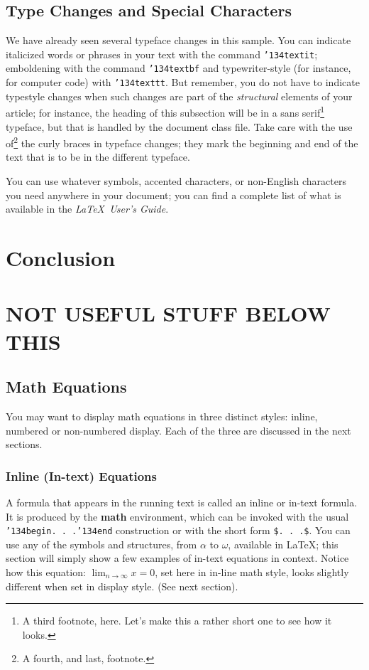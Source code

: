 \documentclass{acm_proc_article-sp}
\begin{document}
\subsection{Type Changes and {\subsecit Special} Characters}
We have already seen several typeface changes in this sample.  You
can indicate italicized words or phrases in your text with
the command \texttt{{\char'134}textit}; emboldening with the
command \texttt{{\char'134}textbf}
and typewriter-style (for instance, for computer code) with
\texttt{{\char'134}texttt}.  But remember, you do not
have to indicate typestyle changes when such changes are
part of the \textit{structural} elements of your
article; for instance, the heading of this subsection will
be in a sans serif\footnote{A third footnote, here.
Let's make this a rather short one to
see how it looks.} typeface, but that is handled by the
document class file. Take care with the use
of\footnote{A fourth, and last, footnote.}
the curly braces in typeface changes; they mark
the beginning and end of
the text that is to be in the different typeface.

You can use whatever symbols, accented characters, or
non-English characters you need anywhere in your document;
you can find a complete list of what is
available in the \textit{\LaTeX\
User's Guide}\cite{Lamport:LaTeX}.

\section{Conclusion}

\section{NOT USEFUL STUFF BELOW THIS}

\subsection{Math Equations}
You may want to display math equations in three distinct styles:
inline, numbered or non-numbered display.  Each of
the three are discussed in the next sections.

\subsubsection{Inline (In-text) Equations}
A formula that appears in the running text is called an
inline or in-text formula.  It is produced by the
\textbf{math} environment, which can be
invoked with the usual \texttt{{\char'134}begin. . .{\char'134}end}
construction or with the short form \texttt{\$. . .\$}. You
can use any of the symbols and structures,
from $\alpha$ to $\omega$, available in
\LaTeX\cite{Lamport:LaTeX}; this section will simply show a
few examples of in-text equations in context. Notice how
this equation: \begin{math}\lim_{n\rightarrow \infty}x=0\end{math},
set here in in-line math style, looks slightly different when
set in display style.  (See next section).
\end{document}
